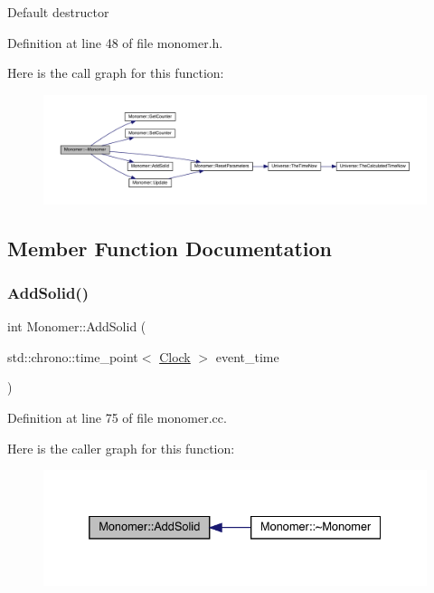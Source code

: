Default destructor 

Definition at line 48 of file monomer.\+h.

Here is the call graph for this function\+:
\nopagebreak
\begin{figure}[H]
\begin{center}
\leavevmode
\includegraphics[width=350pt]{class_monomer_a802bf239fc55d16783736393edbd6899_cgraph}
\end{center}
\end{figure}


\subsection{Member Function Documentation}
\mbox{\label{class_monomer_ac03023c0d1bb67e5f11091af7ad3735d}} 
\subsubsection{\texorpdfstring{Add\+Solid()}{AddSolid()}}
{\footnotesize\ttfamily int Monomer\+::\+Add\+Solid (\begin{DoxyParamCaption}\item[{std\+::chrono\+::time\+\_\+point$<$ \hyperlink{universe_8h_a0ef8d951d1ca5ab3cfaf7ab4c7a6fd80}{Clock} $>$}]{event\+\_\+time }\end{DoxyParamCaption})}



Definition at line 75 of file monomer.\+cc.

Here is the caller graph for this function\+:
\nopagebreak
\begin{figure}[H]
\begin{center}
\leavevmode
\includegraphics[width=332pt]{class_monomer_ac03023c0d1bb67e5f11091af7ad3735d_icgraph}
\end{center}
\end{figure}
\mbox{\label{class_monomer_ae64dfbf82610ae26427be9c824aef70f}} 
